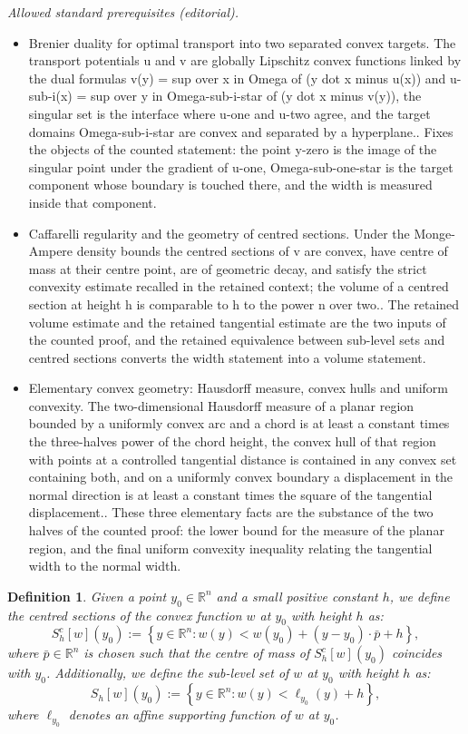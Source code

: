 \documentclass[10pt,a4paper]{amsart}
\theoremstyle{plain}
\newtheorem{definition}{Definition}[section]
\newcommand{\0}{\textbf{0}}
\numberwithin{equation}{section}
\numberwithin{equation}{section}
\numberwithin{figure}{section}
\begin{document}
\noindent\textit{Allowed standard prerequisites (editorial).}\begin{itemize}
\item Brenier duality for optimal transport into two separated convex targets. The transport potentials u and v are globally Lipschitz convex functions linked by the dual formulas v(y) = sup over x in Omega of (y dot x minus u(x)) and u-sub-i(x) = sup over y in Omega-sub-i-star of (y dot x minus v(y)), the singular set is the interface where u-one and u-two agree, and the target domains Omega-sub-i-star are convex and separated by a hyperplane.. Fixes the objects of the counted statement: the point y-zero is the image of the singular point under the gradient of u-one, Omega-sub-one-star is the target component whose boundary is touched there, and the width is measured inside that component.
\item Caffarelli regularity and the geometry of centred sections. Under the Monge-Ampere density bounds the centred sections of v are convex, have centre of mass at their centre point, are of geometric decay, and satisfy the strict convexity estimate recalled in the retained context; the volume of a centred section at height h is comparable to h to the power n over two.. The retained volume estimate and the retained tangential estimate are the two inputs of the counted proof, and the retained equivalence between sub-level sets and centred sections converts the width statement into a volume statement.
\item Elementary convex geometry: Hausdorff measure, convex hulls and uniform convexity. The two-dimensional Hausdorff measure of a planar region bounded by a uniformly convex arc and a chord is at least a constant times the three-halves power of the chord height, the convex hull of that region with points at a controlled tangential distance is contained in any convex set containing both, and on a uniformly convex boundary a displacement in the normal direction is at least a constant times the square of the tangential displacement.. These three elementary facts are the substance of the two halves of the counted proof: the lower bound for the measure of the planar region, and the final uniform convexity inequality relating the tangential width to the normal width.
\end{itemize}\medskip
\begin{definition}\label{defS}
Given a point $y_0\in \mathbb{R}^n$ and a small positive constant $h$, we define the centred sections of the convex function $w$ at $y_0$ with height $h$ as:
\begin{equation}\label{sect}
S^c_{h}[w](y_0) := \left\{y\in\mathbb{R}^n : w(y) < w(y_0) + (y-y_0)\cdot \bar{p} + h\right\},
\end{equation}
where $\bar{p}\in \mathbb{R}^n$ is chosen such that the centre of mass of $S^c_{h}[w](y_0)$ coincides with $y_0$.
Additionally, we define the sub-level set of $w$ at $y_0$ with height $h$ as:
\begin{equation}\label{sub}
S_h[w](y_0) := \left\{y\in \mathbb{R}^n : w(y) < \ell_{y_0}(y) + h\right\},
\end{equation}
where $\ell_{y_0}$ denotes an affine supporting function of $w$ at $y_0$.
\end{definition}
\end{document}
